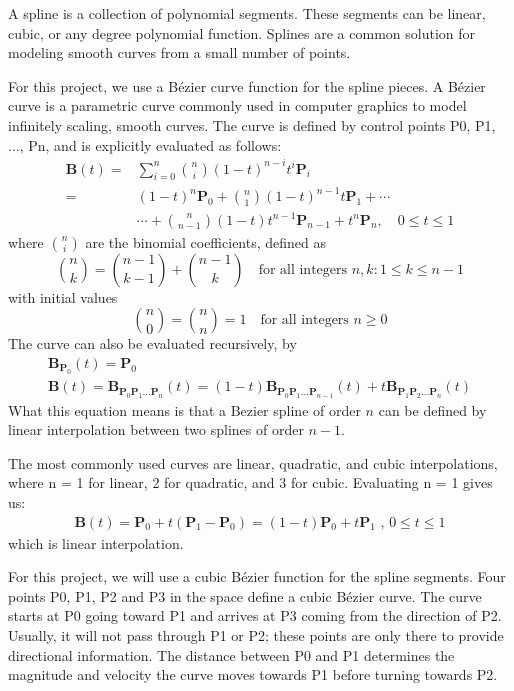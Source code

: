 \documentclass[12pt]{report}
\begin{document}
A spline is a collection of polynomial segments.
These segments can be linear, cubic, or any degree polynomial function.
Splines are a common solution for modeling smooth curves from a small number of points.

For this project, we use a Bézier curve function for the spline pieces.
A Bézier curve is a parametric curve commonly used in computer graphics to model infinitely scaling, smooth curves.
The curve is defined by control points P0, P1, ..., Pn, and is explicitly evaluated as follows:
\begin{align}
  \mathbf{B}(t) = {} &\sum_{i=0}^n {n\choose i}(1 - t)^{n - i}t^i\mathbf{P}_i \\
                = {} &(1 - t)^n\mathbf{P}_0 + {n\choose 1}(1 - t)^{n - 1}t\mathbf{P}_1 + \cdots \\
                  {} &\cdots + {n\choose n - 1}(1 - t)t^{n - 1}\mathbf{P}_{n - 1} + t^n\mathbf{P}_n,\quad 0 \le t \le 1
\end{align}
where $\scriptstyle {n \choose i}$ are the binomial coefficients, defined as
\begin{equation}
\binom nk = \binom{n-1}{k-1} + \binom{n-1}k \quad \text{for all integers }n,k : 1\le k\le n-1
\end{equation}
with initial values 
\begin{equation}
\binom n0 = \binom nn = 1 \quad \text{for all integers } n\ge0
\end{equation}
The curve can also be evaluated recursively, by
\begin{align}
\mathbf{B}_{\mathbf{P}_0}(t) = \mathbf{P}_0 \\
\mathbf{B}(t) = \mathbf{B}_{\mathbf{P}_0\mathbf{P}_1\ldots\mathbf{P}_n}(t) = (1-t)\mathbf{B}_{\mathbf{P}_0\mathbf{P}_1\ldots\mathbf{P}_{n-1}}(t) + t\mathbf{B}_{\mathbf{P}_1\mathbf{P}_2\ldots\mathbf{P}_n}(t)
\end{align}
What this equation means is that a Bezier spline of order $n$ can be defined by linear interpolation between two splines of order $n - 1$.

The most commonly used curves are linear, quadratic, and cubic interpolations, where n = 1 for linear, 2 for quadratic, and 3 for cubic.
Evaluating n = 1 gives us: 
\begin{align}
\mathbf{B}(t)=\mathbf{P}_0 + t(\mathbf{P}_1-\mathbf{P}_0)=(1-t)\mathbf{P}_0 + t\mathbf{P}_1 \mbox{ , } 0 \le t \le 1
\end{align}
which is linear interpolation.


For this project, we will use a cubic Bézier function for the spline segments.
Four points P0, P1, P2 and P3 in the space define a cubic Bézier curve. 
The curve starts at P0 going toward P1 and arrives at P3 coming from the direction of P2. 
Usually, it will not pass through P1 or P2; these points are only there to provide directional information. 
The distance between P0 and P1 determines the magnitude and velocity the curve moves towards P1 before turning towards P2.
\end{document}
